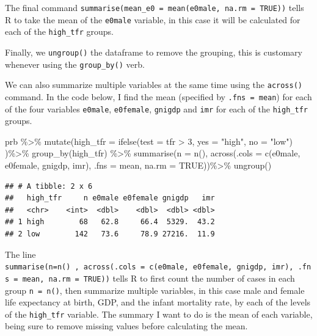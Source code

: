 \documentclass[
]{article}
\newenvironment{Shaded}{\begin{snugshade}}{\end{snugshade}}
\newcommand{\AttributeTok}[1]{\textcolor[rgb]{0.77,0.63,0.00}{#1}}
\newcommand{\ConstantTok}[1]{\textcolor[rgb]{0.00,0.00,0.00}{#1}}
\newcommand{\DecValTok}[1]{\textcolor[rgb]{0.00,0.00,0.81}{#1}}
\newcommand{\FunctionTok}[1]{\textcolor[rgb]{0.00,0.00,0.00}{#1}}
\newcommand{\NormalTok}[1]{#1}
\newcommand{\SpecialCharTok}[1]{\textcolor[rgb]{0.00,0.00,0.00}{#1}}
\newcommand{\StringTok}[1]{\textcolor[rgb]{0.31,0.60,0.02}{#1}}
\begin{document}
The final command \texttt{summarise(mean\_e0\ =\ mean(e0male,\ na.rm\ =\ TRUE))} tells R to take the mean of the \texttt{e0male} variable, in this case it will be calculated for each of the \texttt{high\_tfr} groups.

Finally, we \texttt{ungroup()} the dataframe to remove the grouping, this is
customary whenever using the \texttt{group\_by()} verb.

We can also summarize multiple variables at the same time using the \texttt{across()} command. In the code below, I find the mean (specified by \texttt{.fns\ =\ mean}) for each of the four variables \texttt{e0male}, \texttt{e0female}, \texttt{gnigdp} and \texttt{imr} for each of the \texttt{high\_tfr} groups.

\begin{Shaded}
\begin{Highlighting}[]
\NormalTok{prb }\SpecialCharTok{\%\textgreater{}\%}
  \FunctionTok{mutate}\NormalTok{(}\AttributeTok{high\_tfr =} \FunctionTok{ifelse}\NormalTok{(}\AttributeTok{test =}\NormalTok{ tfr }\SpecialCharTok{\textgreater{}} \DecValTok{3}\NormalTok{,}
                           \AttributeTok{yes =}  \StringTok{"high"}\NormalTok{,}
                           \AttributeTok{no =}  \StringTok{"low"}\NormalTok{) )}\SpecialCharTok{\%\textgreater{}\%}
  \FunctionTok{group\_by}\NormalTok{(high\_tfr) }\SpecialCharTok{\%\textgreater{}\%}
  \FunctionTok{summarise}\NormalTok{(}\AttributeTok{n =} \FunctionTok{n}\NormalTok{(),}
            \FunctionTok{across}\NormalTok{(}\AttributeTok{.cols =} \FunctionTok{c}\NormalTok{(e0male, e0female, gnigdp, imr),}
                   \AttributeTok{.fns =}\NormalTok{ mean,}
                   \AttributeTok{na.rm =} \ConstantTok{TRUE}\NormalTok{))}\SpecialCharTok{\%\textgreater{}\%}
  \FunctionTok{ungroup}\NormalTok{()}
\end{Highlighting}
\end{Shaded}

\begin{verbatim}
## # A tibble: 2 x 6
##   high_tfr     n e0male e0female gnigdp   imr
##   <chr>    <int>  <dbl>    <dbl>  <dbl> <dbl>
## 1 high        68   62.8     66.4  5329.  43.2
## 2 low        142   73.6     78.9 27216.  11.9
\end{verbatim}

The line \texttt{summarise(n=n()\ ,\ across(.cols\ =\ c(e0male,\ e0female,\ gnigdp,\ imr),\ .fns\ =\ mean,\ na.rm\ =\ TRUE))}
tells R to first count the number of cases in each group \texttt{n\ =\ n()}, then
summarize multiple variables, in this case male and female life
expectancy at birth, GDP, and the infant mortality rate, by each of the
levels of the \texttt{high\_tfr} variable. The summary I want to do is the mean
of each variable, being sure to remove missing values before calculating
the mean.
\end{document}
